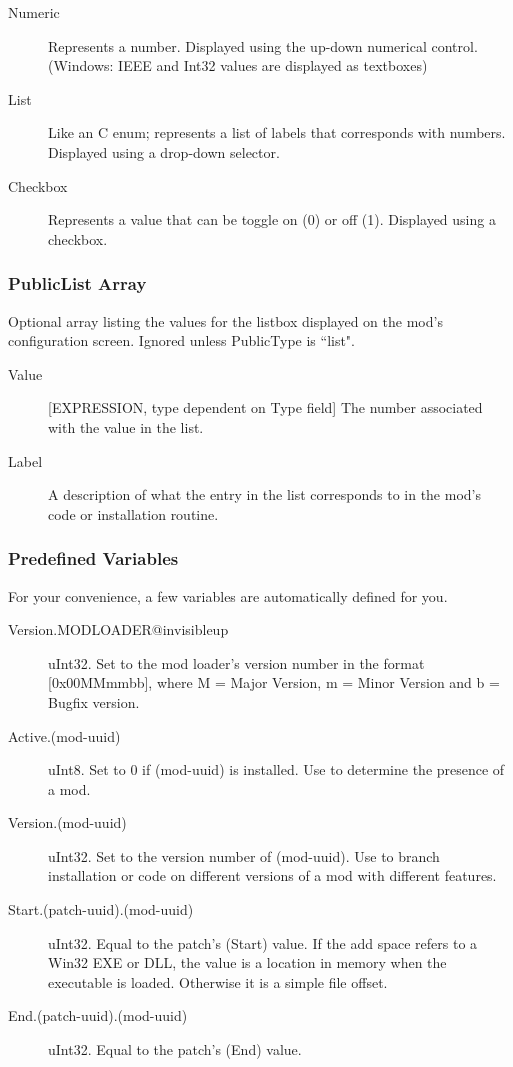 \documentclass[12pt,a4paper,notitlepage]{article}
\begin{document}
\begin{description}
\item[Numeric] Represents a number. Displayed using the up-down numerical control. (Windows: IEEE and Int32 values are displayed as textboxes)
\item[List] Like an C enum; represents a list of labels that corresponds with numbers. Displayed using a drop-down selector.
\item[Checkbox] Represents a value that can be toggle on (0) or off (1). Displayed using a checkbox.
\end{description}

\subsubsection{PublicList Array}
\label{subsubsec:create-var-listarr}
Optional array listing the values for the listbox displayed on the mod's configuration screen. Ignored unless PublicType is ``list".
\begin{description}
\item[Value] [EXPRESSION, type dependent on Type field] The number associated with the value in the list.
\item[Label] A description of what the entry in the list corresponds to in the mod's code or installation routine.
\end{description}


\subsubsection{Predefined Variables}
\label{subsubsec:create-var-predef}
For your convenience, a few variables are automatically defined for you.

\begin{description}
\item[Version.MODLOADER@invisibleup] uInt32. Set to the mod loader's version number in the format [0x00MMmmbb], where M = Major Version, m = Minor Version and b = Bugfix version.
\item[Active.(mod-uuid)] uInt8. Set to 0 if (mod-uuid) is installed. Use to determine the presence of a mod.
\item[Version.(mod-uuid)] uInt32. Set to the version number of (mod-uuid). Use to branch installation or code on different versions of a mod with different features.
\item[Start.(patch-uuid).(mod-uuid)] uInt32. Equal to the patch's (Start) value. If the add space refers to a Win32 EXE or DLL, the value is a location in memory when the executable is loaded. Otherwise it is a simple file offset.
\item[End.(patch-uuid).(mod-uuid)] uInt32. Equal to the patch's (End) value.
\end{description}
\end{document}
